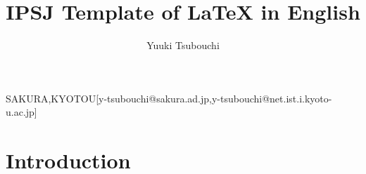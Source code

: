\documentclass[english,JIP]{ipsj} %
\begin{document}
\title{IPSJ Template of LaTeX in English}


\author{Yuuki Tsubouchi}{SAKURA,KYOTOU}[y-tsubouchi@sakura.ad.jp,y-tsubouchi@net.ist.i.kyoto-u.ac.jp]

\begin{abstract}
\end{abstract}

\begin{keyword}
\end{keyword}

\maketitle

\section{Introduction}
\label{sec:introduction}




\end{document}
